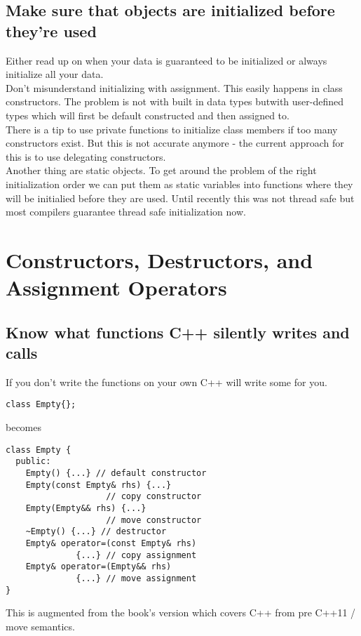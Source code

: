\documentclass[a4paper, twocolumn]{article}
\let\oldsubsection\subsection
\newcounter{mysubsection}
\renewcommand{\subsection}{
    \stepcounter{mysubsection}
    \oldsubsection
}
\begin{document}
\subsection{Make sure that objects are initialized before they're used} \label{ssec:objInitialization}
Either read up on when your data is guaranteed to be initialized or always initialize all your data.\\
Don't misunderstand initializing with assignment. This easily happens in class constructors. The problem is not with built in data types butwith user-defined types which will first be default constructed and then assigned to.\\
There is a tip to use private functions to initialize class members if too many constructors exist. But this is not accurate anymore - the current approach for this is to use delegating constructors.\\
Another thing are static objects. To get around the problem of the right initialization order we can put them as static variables into functions where they will be initialied before they are used. Until recently this was not thread safe but most compilers guarantee thread safe initialization now.
\newpage

\section{Constructors, Destructors, and Assignment Operators}

\subsection{Know what functions C++ silently writes and calls} \label{ssec:silentFunctions}
If you don't write the functions on your own C++ will write some for you.
\begin{verbatim}
class Empty{};
\end{verbatim}
becomes
\begin{verbatim}
class Empty {
  public:
    Empty() {...} // default constructor
    Empty(const Empty& rhs) {...}
                    // copy constructor
    Empty(Empty&& rhs) {...}
                    // move constructor
    ~Empty() {...} // destructor
    Empty& operator=(const Empty& rhs)
              {...} // copy assignment
    Empty& operator=(Empty&& rhs)
              {...} // move assignment
}
\end{verbatim}
This is augmented from the book's version which covers C++ from pre C++11 / move semantics.
\end{document}
